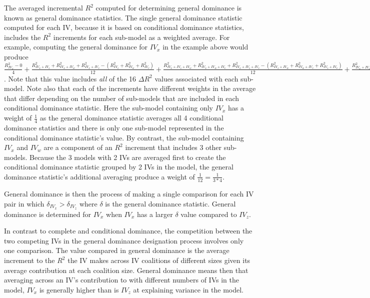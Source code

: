 \documentclass[ShortAfour,times,sageapa]{sagej}
\begin{document}
	The averaged incremental $R^2$ computed for determining general dominance is known as general dominance statistics. The single general dominance statistic computed for each IV, because it is based on conditional dominance statistics, includes the $R^2$ increments for each sub-model as a weighted average.
	For example, computing the general dominance for $IV_x$ in the example above would produce $\frac{R^2_{IV_x} - 0}{4}  + \frac{R^2_{IV_x + IV_z} + R^2_{IV_x + IV_w} + R^2_{IV_x + IV_v} - (R^2_{IV_z} + R^2_{IV_w} + R^2_{IV_v})}{12} + \frac{R^2_{IV_x + IV_z + IV_w} + R^2_{IV_x + IV_w + IV_v} + R^2_{IV_x + IV_z + IV_v} - (R^2_{IV_z + IV_w} + R^2_{IV_w + IV_v} + R^2_{IV_z + IV_v})}{12} + \frac{R^2_{IV_x + IV_z + IV_w + IV_v} - R^2_{IV_z + IV_w + IV_v}}{4}$.
	Note that this value includes \emph{all} of the 16 $\Delta R^2$ values associated with each sub-model.
	Note also that each of the increments have different weights in the average that differ depending on the number of sub-models that are included in each conditional dominance statistic.
	Here the sub-model containing only $IV_x$ has a weight of $\frac{1}{4}$ as the general dominance statistic averages all 4 conditional dominance statistics and there is only one sub-model represented in the conditional dominance statistic's value.
	By contrast, the sub-model containing $IV_x$ and $IV_w$ are a component of an $R^2$ increment that includes 3 other sub-models.
	Because the 3 models with 2 IVs are averaged first to create the conditional dominance statistic grouped by 2 IVs in the model, the general dominance statistic's additional averaging produce a weight of $\frac{1}{12} = \frac{1}{3*4}$.
	
	General dominance is then the process of making a single comparison for each IV pair in which $\delta_{IV_x} > \delta_{IV_z}$ where $\delta$ is the general dominance statistic.
	General dominance is determined for $IV_x$ when $IV_x$ has a larger $\delta$ value compared to $IV_z$.
	
	In contrast to complete and conditional dominance, the competition between the two competing IVs in the general dominance designation process involves only one comparison.
	The value compared in general dominance is the average increment to the $R^2$ the IV makes across IV coalitions of different sizes given its average contribution at each coalition size.
	General dominance means then that averaging across an IV's contribution to with different numbers of IVs in the model, $IV_x$ is generally higher than is $IV_z$ at explaining variance in the model.
	
\end{document}
